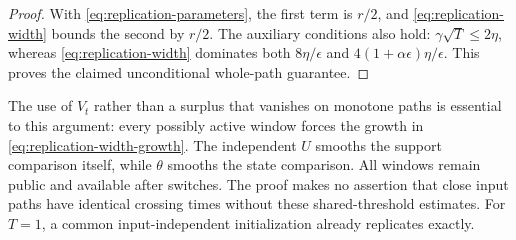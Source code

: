 \begin{proof}
With \eqref{eq:replication-parameters}, the first term is $r/2$, and
\eqref{eq:replication-width} bounds the second by $r/2$. The auxiliary
conditions also hold: $\gamma\sqrt T\le2\eta$, whereas
\eqref{eq:replication-width} dominates both $8\eta/\epsilon$ and
$4(1+\alpha\epsilon)\eta/\epsilon$. This proves the claimed
unconditional whole-path guarantee.
\end{proof}

\begin{remark}
The use of $V_t$ rather than a surplus that vanishes on monotone paths is
essential to this argument: every possibly active window forces the
growth in \eqref{eq:replication-width-growth}. The independent $U$
smooths the support comparison itself, while $\theta$ smooths the state
comparison. All windows remain public and available after switches.
The proof makes no assertion that close input paths have identical
crossing times without these shared-threshold estimates. For $T=1$, a
common input-independent initialization already replicates exactly.
\end{remark}
